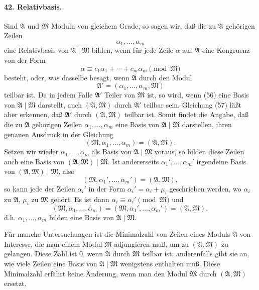 \documentclass[11pt]{article}
\begin{document}
\paragraph{42. Relativbasis.}
Sind $\mathfrak A$ und $\mathfrak M$ Moduln von gleichem Grade, so sagen wir, daß die zu $\mathfrak A$ gehörigen Zeilen
\begin{equation}
\alpha_1,
\ldots,
\alpha_m
\tag{56}
\end{equation}
eine Relativbasis von $\mathfrak A\mid\mathfrak M$ bilden, wenn für jede Zeile $\alpha$ aus $\mathfrak A$ eine Kongruenz von der Form
\[
\alpha\equiv c_1\alpha_1+
\cdots+c_m\alpha_m\pmod{\mathfrak M}
\]
besteht, oder, was dasselbe besagt, wenn $\mathfrak A$ durch den Modul
\begin{equation}
\mathfrak A'=(\alpha_1,
\ldots,
\alpha_m,
\mathfrak M)
\tag{57}
\end{equation}
teilbar ist. Da in jedem Falle $\mathfrak A'$ Teiler von $\mathfrak M$ ist, so wird, wenn (56) eine Basis von $\mathfrak A\mid\mathfrak M$ darstellt, auch $(\mathfrak A,
\mathfrak M)$ durch $\mathfrak A'$ teilbar sein. Gleichung (57) läßt aber erkennen, daß $\mathfrak A'$ durch $(\mathfrak A,
\mathfrak M)$ teilbar ist. Somit findet die Angabe, daß die zu $\mathfrak A$ gehörigen Zeilen $\alpha_1,
\ldots,
\alpha_m$ eine Basis von $\mathfrak A\mid\mathfrak M$ darstellen, ihren genauen Ausdruck in der Gleichung
\begin{equation}
(\mathfrak M,
\alpha_1,
\ldots,
\alpha_m)=(\mathfrak A,
\mathfrak M).
\tag{58}
\end{equation}
Setzen wir wieder $\alpha_1,
\ldots,
\alpha_m$ als Basis von $\mathfrak A\mid\mathfrak M$ voraus, so bilden diese Zeilen auch eine Basis von $(\mathfrak A,
\mathfrak M)\mid\mathfrak M$. Ist andererseits $\alpha_1',
\ldots,
\alpha_m'$ irgendeine Basis von $(\mathfrak A,
\mathfrak M)\mid\mathfrak M$, also
\begin{equation}
(\mathfrak M,
\alpha_1',
\ldots,
\alpha_m')=(\mathfrak A,
\mathfrak M),
\tag{59}
\end{equation}
so kann jede der Zeilen $\alpha_i'$ in der Form $\alpha_i'=\alpha_i+\mu_i$ geschrieben werden, wo $\alpha_i$ zu $\mathfrak A$, $\mu_i$ zu $\mathfrak M$ gehört. Es ist dann $\alpha_i\equiv\alpha_i'\pmod{\mathfrak M}$ und
\[
(\mathfrak M,
\alpha_1,
\ldots,
\alpha_m)=(\mathfrak M,
\alpha_1',
\ldots,
\alpha_m')=(\mathfrak A,
\mathfrak M),
\]
d.h. $\alpha_1,
\ldots,
\alpha_m$ bilden eine Basis von $\mathfrak A\mid\mathfrak M$.

Für manche Untersuchungen ist die Minimalzahl von Zeilen eines Moduls $\mathfrak A$ von Interesse, die man einem Modul $\mathfrak M$ adjungieren muß, um zu $(\mathfrak A,
\mathfrak M)$ zu gelangen. Diese Zahl ist $0$, wenn $\mathfrak A$ durch $\mathfrak M$ teilbar ist; anderenfalls gibt sie an, wie viele Zeilen eine Basis von $\mathfrak A\mid\mathfrak M$ wenigstens enthalten muß. Diese Minimalzahl erfährt keine Änderung, wenn man den Modul $\mathfrak M$ durch $(\mathfrak A,
\mathfrak M)$ ersetzt.
\end{document}
